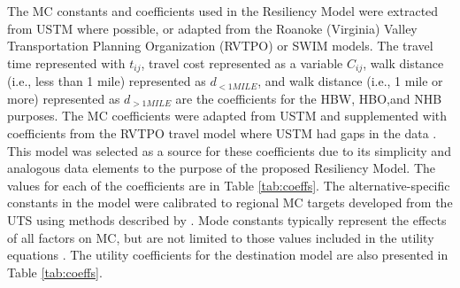 The MC constants and coefficients used in the Resiliency Model were extracted
from USTM where possible, or adapted from the Roanoke (Virginia)
Valley Transportation Planning Organization (RVTPO) or SWIM models. The travel time represented with $t_{ij}$, travel cost
represented as a variable $C_{ij}$, walk distance (i.e., less than 1 mile) represented
as $d_{<1MILE}$, and walk distance (i.e., 1 mile or more) represented as $d_{>1MILE}$
are the coefficients for the
HBW, HBO,and NHB purposes. The MC coefficients were adapted
from USTM and supplemented with coefficients from the RVTPO travel model where USTM had gaps in the data \citep{rvtpoversion, swimversion}. This model was
selected as a source for these coefficients due to its simplicity and analogous data elements to the purpose of the proposed Resiliency Model. The
values for each of the coefficients are in Table \ref{tab:coeffs}. The alternative-specific constants in the model were calibrated to regional MC
targets developed from the UTS using
methods described by \citet{koppelman2006}.
Mode constants typically represent the effects of all factors on MC, but are not limited to
those values included in the utility equations \citep{koppelman2006}. The utility coefficients for the destination model are
also presented in Table \ref{tab:coeffs}.

